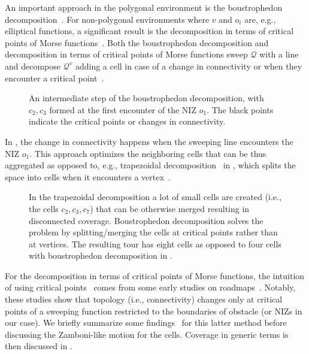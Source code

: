 An important approach in the polygonal environment is the boustrophedon decomposition~\citep{choset2000coverage}. For non-polygonal environments where $v$ and $o_i$ are, e.g., elliptical functions, a significant result is the decomposition in terms of critical points of Morse functions~\citep{choset2000exact}. Both the boustrophedon decomposition and decomposition in terms of critical points of Morse functions sweep $\mathcal{Q}$ with a line and decompose $\mathcal{Q}^v$ adding a cell in case of a change in connectivity or when they encounter a critical point~\citep{choset2000coverage,choset2001coverage,choset2005principles}. 
\begin{figure}[h]
  \centering
  \selectfont
  
  \caption[Intermediate step of the boustrophedon decomposition]{An intermediate step of the boustrophedon decomposition, with $c_2,c_3$ formed at the first encounter of the NIZ $o_1$. The black points indicate the critical points or changes in connectivity.
  }
  \label{fig:bcd3}
\end{figure}
In , the change in connectivity happens when the sweeping line encounters the NIZ $o_1$. This approach optimizes the neighboring cells that can be thus aggregated as opposed to, e.g., trapezoidal decomposition~\citep{galceran2013survey} in , which splits the space into cells when it encounters a vertex~\citep{lavalle2006planning}.
\begin{figure}[h]
  \centering
  \selectfont
  
  \caption[Trapezoidal decomposition]{In the trapezoidal decomposition a lot of small cells are created (i.e., the cells $c_2,c_3,c_7$) that can be otherwise merged resulting in disconnected coverage. Boustrophedon decomposition solves the problem by splitting/merging the cells at critical points rather than at vertices. The resulting tour has eight cells as opposed to four cells with boustrophedon decomposition in .}
  \label{fig:trap}
\end{figure}
For the decomposition in terms of critical points of Morse functions, the intuition of using critical points~\citep{choset2000exact} comes from some early studies on roadmaps~\citep{canny1988complexity,canny1988constructing,canny1993opportunistic}. Notably, these studies show that topology (i.e., connectivity) changes only at critical points of a sweeping function restricted to the boundaries of obstacle (or NIZs in our case). We briefly summarize some findings~\citep{choset2000exact} for this latter method before discussing the Zamboni-like motion for the cells. Coverage in generic terms is then discussed in .

